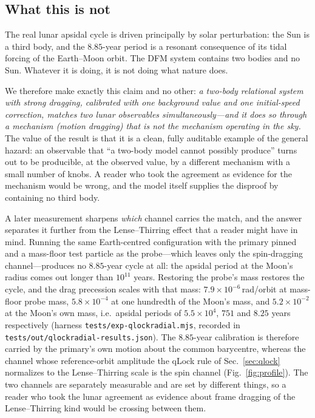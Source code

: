 \documentclass[aps,reprint,amsmath,amssymb,nofootinbib,superscriptaddress,floatfix]{revtex4-2}
\begin{document}
\subsection{What this is not}
\label{sec:p3not}

The real lunar apsidal cycle is driven principally by solar
perturbation: the Sun is a third body, and the $8.85$-year period is a
resonant consequence of its tidal forcing of the Earth--Moon orbit.
The DFM system contains two bodies and no Sun.
Whatever it is doing, it is not doing what nature does.

We therefore make exactly this claim and no other: \emph{a two-body
relational system with strong dragging, calibrated with one background
value and one initial-speed correction, matches two lunar observables
simultaneously---and it does so through a mechanism (motion dragging)
that is not the mechanism operating in the sky.}
The value of the result is that it is a clean, fully auditable example
of the general hazard: an observable that ``a two-body model cannot
possibly produce'' turns out to be producible, at the observed value,
by a different mechanism with a small number of knobs.
A reader who took the agreement as evidence for the mechanism would be
wrong, and the model itself supplies the disproof by containing no
third body.

A later measurement sharpens \emph{which} channel carries the match,
and the answer separates it further from the Lense--Thirring effect
that a reader might have in mind.
Running the same Earth-centred configuration with the primary pinned
and a mass-floor test particle as the probe---which leaves only the
spin-dragging channel---produces no $8.85$-year cycle at all: the
apsidal period at the Moon's radius comes out longer than
$10^{11}$ years.
Restoring the probe's mass restores the cycle, and the drag precession
scales with that mass: $7.9\times10^{-6}$\,rad/orbit at mass-floor
probe mass, $5.8\times10^{-4}$ at one hundredth of the Moon's mass,
and $5.2\times10^{-2}$ at the Moon's own mass, i.e.\ apsidal periods
of $5.5\times10^{4}$, $751$ and $8.25$ years respectively (harness
\texttt{tests/exp-qlockradial.mjs}, recorded in
\texttt{tests/out/qlockradial-results.json}).
The $8.85$-year calibration is therefore carried by the primary's own
motion about the common barycentre, whereas the channel whose
reference-orbit amplitude the qLock rule of Sec.~\ref{sec:qlock}
normalizes to the Lense--Thirring scale is the spin channel
(Fig.~\ref{fig:profile}).
The two channels are separately measurable and are set by different
things, so a reader who took the lunar agreement as evidence about
frame dragging of the Lense--Thirring kind would be crossing between
them.
\end{document}
